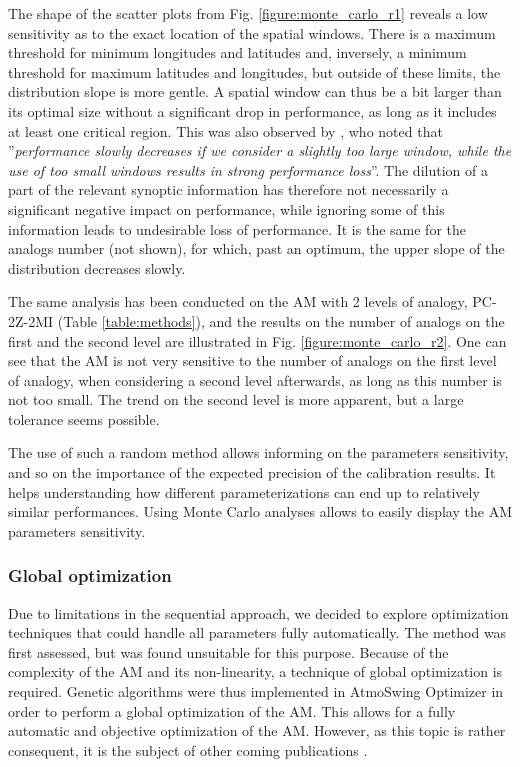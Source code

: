 \documentclass[review]{elsarticle}
\begin{document}
The shape of the scatter plots from Fig. \ref{figure:monte_carlo_r1} reveals a low sensitivity as to the exact location of the spatial windows. There is a maximum threshold for minimum longitudes and latitudes and, inversely, a minimum threshold for maximum latitudes and longitudes, but outside of these limits, the distribution slope is more gentle. A spatial window can thus be a bit larger than its optimal size without a significant drop in performance, as long as it includes at least one critical region. This was also observed by \citet{Bontron2004}, who noted that ''\textit{performance slowly decreases if we consider a slightly too large window, while the use of too small windows results in strong performance loss}''. The dilution of a part of the relevant synoptic information has therefore not necessarily a significant negative impact on performance, while ignoring some of this information leads to undesirable loss of performance. It is the same for the analogs number (not shown), for which, past an optimum, the upper slope of the distribution decreases slowly.

The same analysis has been conducted on the AM with 2 levels of analogy, PC-2Z-2MI (Table \ref{table:methods}), and the results on the number of analogs on the first and the second level are illustrated in Fig. \ref{figure:monte_carlo_r2}. One can see that the AM is not very sensitive to the number of analogs on the first level of analogy, when considering a second level afterwards, as long as this number is not too small. The trend on the second level is more apparent, but a large tolerance seems possible.

The use of such a random method allows informing on the parameters sensitivity, and so on the importance of the expected precision of the calibration results. It helps understanding how different parameterizations can end up to relatively similar performances. Using Monte Carlo analyses allows to easily display the AM parameters sensitivity. 


\subsubsection{Global optimization}
\label{sec:atmoswing-optimization}

Due to limitations in the sequential approach, we decided to explore optimization techniques that could handle all parameters fully automatically. The \citet{Nelder1965a} method was first assessed, but was found unsuitable for this purpose. Because of the complexity of the AM and its non-linearity, a technique of global optimization is required. Genetic algorithms were thus implemented in AtmoSwing Optimizer in order to perform a global optimization of the AM. This allows for a fully automatic and objective optimization of the AM. However, as this topic is rather consequent, it is the subject of other coming publications \cite[see][]{Horton2016a, Horton2016b}.
\end{document}
